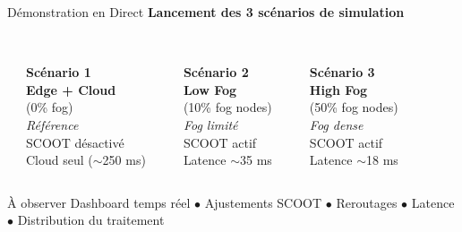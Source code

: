 \documentclass[10pt,aspectratio=169]{beamer}
\begin{document}
\begin{frame}{D\'emonstration en Direct}
\centering
\Large\textbf{Lancement des 3 sc\'enarios de simulation}

\vspace{0.5cm}
\begin{columns}
\centering
\textcolor{red}{\rule{2cm}{3pt}}\\
\vspace{0.2cm}
{\large\textbf{Sc\'enario 1}}\\
\vspace{0.1cm}
\textbf{Edge + Cloud}\\
(0\% fog)\\
\vspace{0.2cm}
{\small\textit{R\'ef\'erence}}\\
{\small SCOOT d\'esactiv\'e}\\
{\small Cloud seul ($\sim$250 ms)}

\centering
\textcolor{orange}{\rule{2cm}{3pt}}\\
\vspace{0.2cm}
{\large\textbf{Sc\'enario 2}}\\
\vspace{0.1cm}
\textbf{Low Fog}\\
(10\% fog nodes)\\
\vspace{0.2cm}
{\small\textit{Fog limit\'e}}\\
{\small SCOOT actif}\\
{\small Latence $\sim$35 ms}

\centering
\textcolor{green!60!black}{\rule{2cm}{3pt}}\\
\vspace{0.2cm}
{\large\textbf{Sc\'enario 3}}\\
\vspace{0.1cm}
\textbf{High Fog}\\
(50\% fog nodes)\\
\vspace{0.2cm}
{\small\textit{Fog dense}}\\
{\small SCOOT actif}\\
{\small Latence $\sim$18 ms}
\end{columns}

\vspace{0.5cm}
\begin{alertblock}{\`A observer}
Dashboard temps r\'eel $\bullet$ Ajustements SCOOT $\bullet$ Reroutages $\bullet$ Latence $\bullet$ Distribution du traitement
\end{alertblock}
\end{frame}
\end{document}
